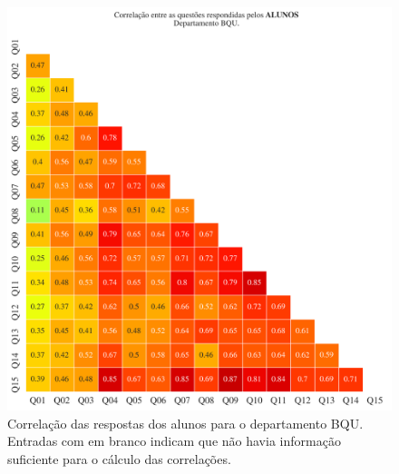 \documentclass[a4paper,10pt]{article}
\begin{document}
\begin{figure}[h]
\centering
\includegraphics[width=0.999\linewidth]{matriz_corr__BQU_alunos.png}
\caption{\label{fig:corr_alunos}Correlação das respostas dos alunos para o departamento BQU. Entradas com em branco indicam que não havia informação suficiente para o cálculo das correlações.}
\end{figure}
\end{document}
